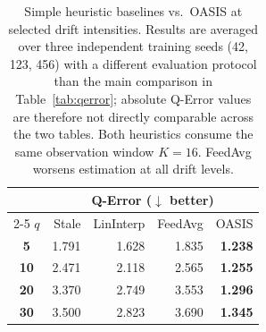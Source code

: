 \begin{table}[t]
  \centering
  \small
  \caption{Simple heuristic baselines vs.\ OASIS at selected drift intensities. Results are averaged over three independent training seeds (42, 123, 456) with a different evaluation protocol than the main comparison in Table~\ref{tab:qerror}; absolute Q-Error values are therefore not directly comparable across the two tables. Both heuristics consume the same observation window $K{=}16$. FeedAvg worsens estimation at all drift levels.}
  \label{tab:simple_baselines}
  \setlength{\tabcolsep}{5pt}
  \begin{tabular}{c | rrrr}
    \toprule
    & \multicolumn{4}{c}{Q-Error ($\downarrow$ better)} \\
    \cmidrule(lr){2-5}
    $q$ & Stale & LinInterp & FeedAvg & OASIS \\
    \midrule
    \textbf{ 5} & 1.791 & 1.628 & 1.835 & \textbf{1.238} \\
    \textbf{10} & 2.471 & 2.118 & 2.565 & \textbf{1.255} \\
    \textbf{20} & 3.370 & 2.749 & 3.553 & \textbf{1.296} \\
    \textbf{30} & 3.500 & 2.823 & 3.690 & \textbf{1.345} \\
    \bottomrule
  \end{tabular}
\end{table}
